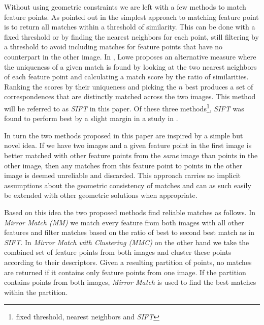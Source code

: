 \documentclass[conference]{IEEEtran}
\begin{document}
Without using geometric constraints we are left with a few methods to 
match feature points. As pointed out in \cite{szeliski2010} the simplest 
approach to matching feature point is to return all matches within a 
threshold of similarity.  This can be done with a fixed threshold or by 
finding the nearest neighbors for each point, still filtering by a 
threshold to avoid including matches for feature points that have no 
counterpart in the other image.  In \cite{lowe2004sift}, Lowe proposes 
an alternative measure where the uniqueness of a given match is found by 
looking at the two nearest neighbors of each feature point and 
calculating a match score by the ratio of similarities.  Ranking the 
scores by their uniqueness and picking the $n$ best produces a set of 
correspondences that are distinctly matched across the two images. This 
method will be referred to as \emph{SIFT} in this paper. Of these three 
methods\footnote{fixed threshold, nearest neighbors and \emph{SIFT}}, 
\emph{SIFT} was found to perform best by a slight margin in a study in 
\cite{mikolajczyk2005performance}.

In turn the two methods proposed in this paper are inspired by a simple 
but novel idea. If we have two images and a given feature point in the 
first image is better matched with other feature points from the 
\emph{same} image than points in the other image, then any matches from 
this feature point to points in the other image is deemed unreliable and 
discarded.  This approach carries no implicit assumptions about the 
geometric consistency of matches and can as such easily be extended with 
other geometric solutions when appropriate.

Based on this idea the two proposed methods find reliable matches as 
follows. In \emph{Mirror Match (MM)} we match every feature from both 
images with all other features and filter matches based on the ratio of 
best to second best match as in \emph{SIFT}. In \emph{Mirror Match with 
Clustering (MMC)} on the other hand we take the combined set of feature 
points from both images and cluster these points according to their 
descriptors.  Given a resulting partition of points, no matches are 
returned if it contains only feature points from one image.  If the 
partition contains points from both images, \emph{Mirror Match} is used 
to find the best matches within the partition.
\end{document}
